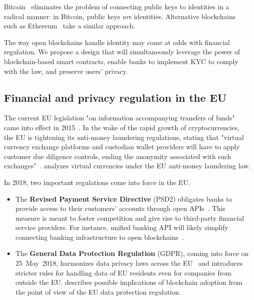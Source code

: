 Bitcoin~\cite{Nakamoto2008} eliminates the problem of connecting public keys to identities in a radical manner: in Bitcoin, public keys \textit{are} identities.
Alternative blockchains such as Ethereum~\cite{Buterin2014, Wood2014} take a similar approach.

The way open blockchains handle identity may come at odds with financial regulation.
We propose a design that will simultaneously leverage the power of blockchain-based smart contracts, enable banks to implement KYC to comply with the law, and preserve users' privacy.


\subsection{Financial and privacy regulation in the EU} \label{sec:Ch12KYCEU}

The current EU legislation "on information accompanying transfers of funds" came into effect in 2015~\cite{EU847}.
In the wake of the rapid growth of cryptocurrencies, the EU is tightening its anti-money laundering regulations, stating that "virtual currency exchange platforms and custodian wallet providers will have to apply customer due diligence controls, ending the anonymity associated with such exchanges"~\cite{EU16}.
\cite{Vandezande2017} analyzes virtual currencies under the EU anti-money laundering law.

In 2018, two important regulations come into force in the EU.

\begin{itemize}
	\item The \textbf{Revised Payment Service Directive} (PSD2) obligates banks to provide access to their customers' accounts through open APIs~\cite{Hellstroem2017}.
	This measure is meant to foster competition and give rise to third-party financial service providers.
	For instance, unified banking API will likely simplify connecting banking infrastructure to open blockchains~\cite{Elison2016}.
	\item The \textbf{General Data Protection Regulation} (GDPR), coming into force on 25~May~2018, harmonizes data privacy laws across the EU~\cite{GDPR16} and introduces stricter rules for handling data of EU residents even for companies from outside the EU.
	\cite{Berberich2016} describes possible implications of blockchain adoption from the point of view of the EU data protection regulation.
\end{itemize}



